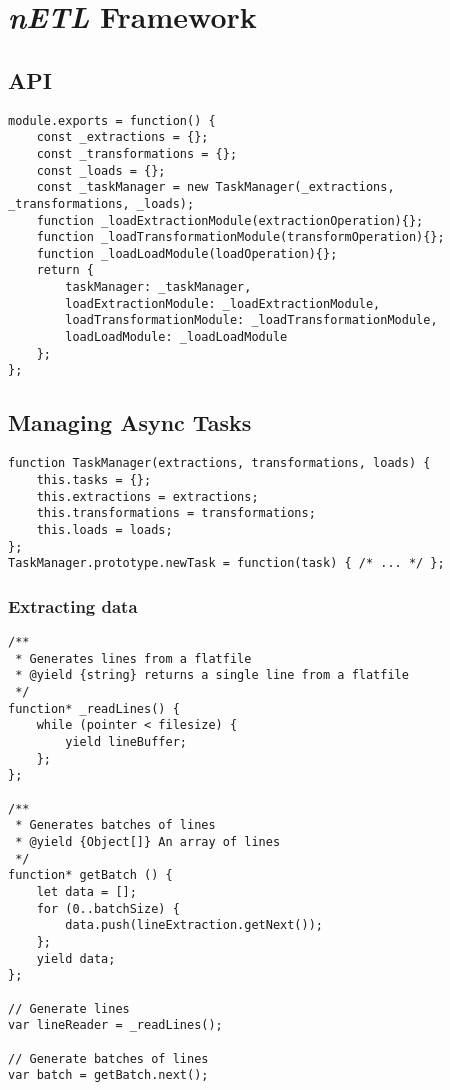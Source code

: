\section{\textit{nETL} Framework}

\subsection*{API}
\label{appendix:netl-main}
\begin{verbatim}
module.exports = function() {
    const _extractions = {};
    const _transformations = {};
    const _loads = {};        
    const _taskManager = new TaskManager(_extractions, _transformations, _loads);
    function _loadExtractionModule(extractionOperation){};
    function _loadTransformationModule(transformOperation){};
    function _loadLoadModule(loadOperation){};
    return {
        taskManager: _taskManager,
        loadExtractionModule: _loadExtractionModule,
        loadTransformationModule: _loadTransformationModule,
        loadLoadModule: _loadLoadModule
    };
};
\end{verbatim}

\subsection{Managing Async Tasks}
\label{appendix:netl-taskmanager}
\begin{verbatim}
function TaskManager(extractions, transformations, loads) {
    this.tasks = {};
    this.extractions = extractions;
    this.transformations = transformations;
    this.loads = loads;
};
TaskManager.prototype.newTask = function(task) { /* ... */ };
\end{verbatim}

\subsubsection{Extracting data}
\label{appendix:netl-extraction}
\begin{verbatim}
/**
 * Generates lines from a flatfile
 * @yield {string} returns a single line from a flatfile
 */
function* _readLines() {
    while (pointer < filesize) {
        yield lineBuffer;
    };
};

/**
 * Generates batches of lines
 * @yield {Object[]} An array of lines
 */
function* getBatch () {
    let data = [];
    for (0..batchSize) {
        data.push(lineExtraction.getNext());
    };
    yield data;
};

// Generate lines
var lineReader = _readLines();

// Generate batches of lines
var batch = getBatch.next();
\end{verbatim}

